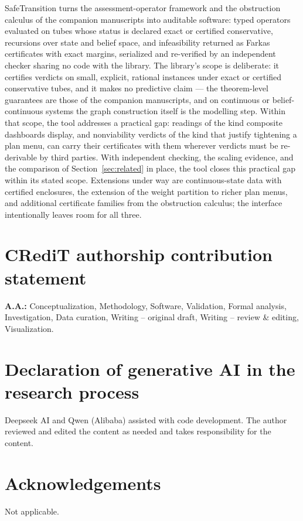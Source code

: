 \documentclass[11pt]{article}
\begin{document}
SafeTransition turns the assessment-operator framework and the obstruction
calculus of the companion manuscripts into auditable software: typed
operators evaluated on tubes whose status is declared exact or certified
conservative, recursions over state and belief space, and infeasibility
returned as Farkas certificates with exact margins,
serialized and re-verified by an independent checker sharing no code with
the library. The library's scope is deliberate: it certifies verdicts on
small, explicit, rational instances under exact or certified conservative
tubes, and it makes no predictive claim --- the theorem-level guarantees
are those of the companion manuscripts, and on continuous or
belief-continuous systems the graph construction itself is the modelling
step. Within that scope, the tool addresses a practical gap: readings of
the kind composite dashboards display, and nonviability verdicts of the
kind that justify tightening a plan menu, can carry their certificates with
them wherever verdicts must be re-derivable by third parties. With
independent checking, the scaling evidence, and the comparison of
Section~\ref{sec:related} in place, the tool closes this practical gap
within its stated scope. Extensions
under way are continuous-state data with certified enclosures, the
extension of the weight partition to richer plan menus, and additional
certificate families from the obstruction calculus; the interface
intentionally leaves room for all three.

\section*{CRediT authorship contribution statement}
\textbf{A.A.:} Conceptualization, Methodology, Software, Validation,
Formal analysis, Investigation, Data curation, Writing -- original draft,
Writing -- review \& editing, Visualization.

\section*{Declaration of generative AI in the research process}
Deepseek AI and Qwen (Alibaba) assisted with code development. The author
reviewed and edited the content as needed and takes responsibility for the
content.

\section*{Acknowledgements}
Not applicable.
\end{document}
